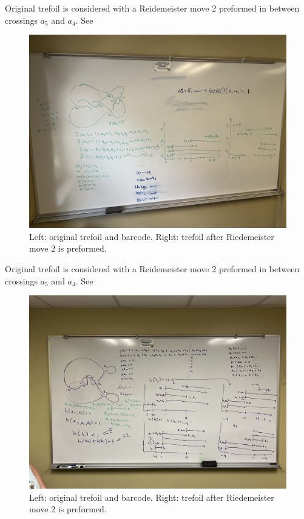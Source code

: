 \documentclass[General-Information/Most_recent_log(3_0).tex]{subfiles}
\begin{document}
\begin{example}
    \label{ex:5}
    Original trefoil is considered with a Reidemeister move 2 preformed in between crossings $a_5$ and $a_4$. See 
    \begin{figure}[H]
        \centering
        \includegraphics[width=\textwidth]{General-Information/Pictures/Examples/IMG-2759.JPG}
        \caption{Left: original trefoil and barcode. Right: trefoil after Riedemeister move 2 is preformed.}
    \end{figure}
\end{example}

\begin{example}
    \label{ex:6}
    Original trefoil is considered with a Reidemeister move 2 preformed in between crossings $a_5$ and $a_4$. See 
    \begin{figure}[H]
        \centering
        \includegraphics[width=\textwidth]{General-Information/Pictures/Examples/IMG-2760.JPG}
        \caption{Left: original trefoil and barcode. Right: trefoil after Riedemeister move 2 is preformed.}
    \end{figure}
\end{example}
\end{document}
